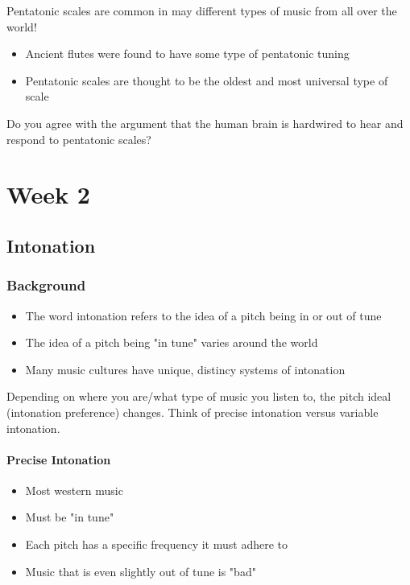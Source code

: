 \documentclass[12pt, a4paper]{report}
\begin{document}
  Pentatonic scales are common in may different types of music from all over the world!

  \begin{itemize}
    \item Ancient flutes were found to have some type of pentatonic tuning
    \item Pentatonic scales are thought to be the oldest and most universal type of scale
  \end{itemize}

  Do you agree with the argument that the human brain is hardwired to hear and respond to pentatonic scales?



  \part{Week 2}

  \chapter{Intonation}

  \section{Background}

  \begin{itemize}
    \item The word intonation refers to the idea of a pitch being in or out of tune
    \item The idea of a pitch being "in tune" varies around the world
    \item Many music cultures have unique, distincy systems of intonation
  \end{itemize}

  Depending on where you are/what type of music you listen to, the pitch ideal (intonation preference) changes. Think of precise intonation versus variable intonation.

  \subsection{Precise Intonation}

  \begin{itemize}
    \item Most western music
    \item Must be "in tune"
    \item Each pitch has a specific frequency it must adhere to
    \item Music that is even slightly out of tune is "bad"
  \end{itemize}
\end{document}

